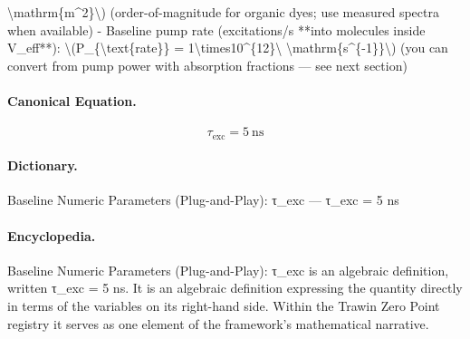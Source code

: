 \textbackslash{}mathrm\{m\textasciicircum{}2\}\textbackslash{}) (order-of-magnitude for organic dyes; use measured spectra when available) - Baseline pump rate (excitations/s **into molecules inside V\_eff**): \textbackslash{}(P\_\{\textbackslash{}text\{rate\}\} = 1\textbackslash{}times10\textasciicircum{}\{12\}\textbackslash{} \textbackslash{}mathrm\{s\textasciicircum{}\{-1\}\}\textbackslash{}) (you can convert from pump power with absorption fractions — see next section)

\paragraph{Canonical Equation.}
\[
\tau_{\text{exc}} = 5\ \text{ns}
\]

\paragraph{Dictionary.}
Baseline Numeric Parameters (Plug-and-Play): τ\_exc — τ\_exc = 5 ns

\paragraph{Encyclopedia.}
Baseline Numeric Parameters (Plug-and-Play): τ\_exc is an algebraic definition, written τ\_exc = 5 ns. It is an algebraic definition expressing the quantity directly in terms of the variables on its right-hand side. Within the Trawin Zero Point registry it serves as one element of the framework's mathematical narrative.
